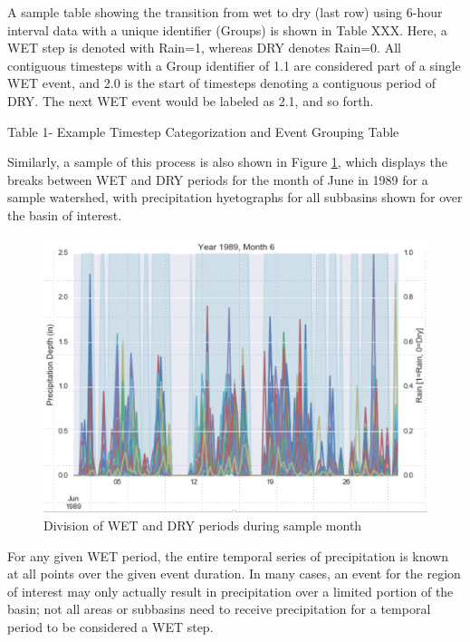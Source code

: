 \documentclass[11pt]{article} %
\begin{document}
A sample table showing the transition from wet to dry (last row) using 6-hour interval data with a unique identifier (Groups) is shown in Table XXX. Here, a WET step is denoted with Rain=1, whereas DRY denotes Rain=0. All contiguous timesteps with a Group identifier of 1.1 are considered part of a single WET event, and 2.0 is the start of timesteps denoting a contiguous period of DRY. The next WET event would be labeled as 2.1, and so forth.
 
Table 1- Example Timestep Categorization and Event Grouping Table

Similarly, a sample of this process is also shown in Figure \ref{SampleEvents}, which displays the breaks between WET and DRY periods for the month of June in 1989 for a sample watershed, with precipitation hyetographs for all subbasins shown for over the basin of interest.
 
\begin{figure}%
\center
\noindent\includegraphics[scale=.7]{./Figures/SampleBreaks} 
\caption[]{Division of WET and DRY periods during sample month}
\label{SampleEvents}	
\end{figure}

For any given WET period, the entire temporal series of precipitation is known at all points over the given event duration. In many cases, an event for the region of interest may only actually result in precipitation over a limited portion of the basin; not all areas or subbasins need to receive precipitation for a temporal period to be considered a WET step.
\end{document}
